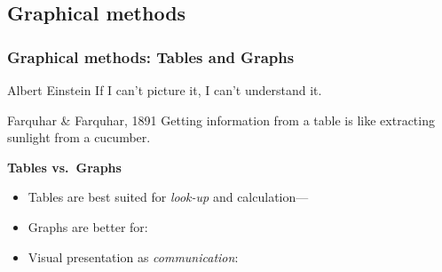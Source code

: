 \subsection{Graphical methods}
\begin{frame}
  \frametitle{Graphical methods: Tables and Graphs}

  \begin{namedQuote}{Albert Einstein}
  If I can't picture it, I can't understand it.
  \end{namedQuote}
  \begin{namedQuote}{Farquhar \& Farquhar, 1891}
  Getting information from a table is like extracting sunlight
  from a cucumber.
  \end{namedQuote}


  \begin{block}{\large\bfseries Tables vs.\ Graphs}
      \begin{itemize}
      \item Tables are best suited for \emph{look-up} and calculation---  

	  \item Graphs are better for:
	  \item Visual presentation as \emph{communication}: 
	  \end{itemize}
  \end{block}
\end{frame}


